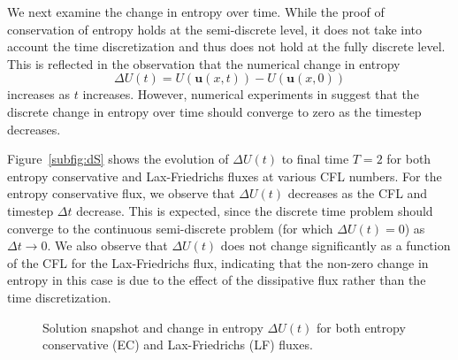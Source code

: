 \documentclass[preprint,10pt]{elsarticle}
\theoremstyle{definition}
\theoremstyle{lemma}
\theoremstyle{theorem}
\theoremstyle{assumption}
\newcommand{\LRp}[1]{\left( #1 \right)}
\begin{document}
We next examine the change in entropy over time.  While the proof of conservation of entropy holds at the semi-discrete level, it does not take into account the time discretization and thus does not hold at the fully discrete level.  This is reflected in the observation that the numerical change in entropy 
\[
\Delta U(t) = U\LRp{\bm{u}(x,t)} - U\LRp{\bm{u}(x,0)}
\]
increases as $t$ increases.  However, numerical experiments in \cite{gassner2016well} suggest that the discrete change in entropy over time should converge to zero as the timestep decreases.%

Figure~\ref{subfig:dS} shows the evolution of $\Delta U(t)$ to final time $T=2$ for both entropy conservative and Lax-Friedrichs fluxes at various CFL numbers.  For the entropy conservative flux, we observe that $\Delta U(t)$ decreases as the CFL and timestep $\Delta t$ decrease.  This is expected, since the discrete time problem should converge to the continuous semi-discrete problem (for which $\Delta U(t) = 0$) as $\Delta t\rightarrow 0$.  We also observe that $\Delta U(t)$ does not change significantly as a function of the CFL for the Lax-Friedrichs flux, indicating that the non-zero change in entropy in this case is due to the effect of the dissipative flux rather than the time discretization.

\begin{figure}
\centering
{}
\hspace{.5em}
\caption{Solution snapshot and change in entropy $\Delta U(t)$ for both entropy conservative (EC) and Lax-Friedrichs (LF) fluxes.}
\label{fig:dS}
\end{figure}
\end{document}
